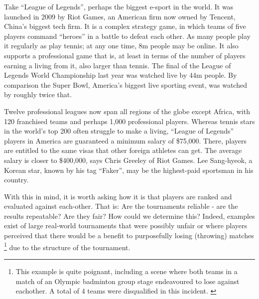 \documentclass[a4,11pt,twoside,final,hidelinks]{article}
\newenvironment{itquote} {\begin{quoting}\color{darkgray}} {\end{quoting}}
\begin{document}
\begin{itquote}
Take “League of Legends”, perhaps the biggest e-sport in the world. It was
launched in 2009 by Riot Games, an American firm now owned by Tencent, China’s
biggest tech firm. It is a complex strategy game, in which teams of five players
command “heroes” in a battle to defeat each other. As many people play it
regularly as play tennis; at any one time, 8m people may be online. It also
supports a professional game that is, at least in terms of the number of players
earning a living from it, also larger than tennis. The final of the League of
Legends World Championship last year was watched live by 44m people. By
comparison the Super Bowl, America’s biggest live sporting event, was watched by
roughly twice that.

Twelve professional leagues now span all regions of the globe except Africa,
with 120 franchised teams and perhaps 1,000 professional players. Whereas tennis
stars in the world’s top 200 often struggle to make a living, “League of
Legends” players in America are guaranteed a minimum salary of \$75,000. There,
players are entitled to the same visas that other foreign athletes can get. The
average salary is closer to \$400,000, says Chris Greeley of Riot Games. Lee
Sang-hyeok, a Korean star, known by his tag “Faker”, may be the highest-paid
sportsman in his country.
\end{itquote}

With this in mind, it is worth asking how it is that players are ranked and
evaluated against each-other. That is: Are the tournaments reliable - are the
results repeatable? Are they fair? How could we determine this? Indeed, examples
exist of large real-world tournaments that were possibly unfair
\autocite{fifa-quant-unfairness}\autocite{fifa-risk-of-collusion} or where players
perceived that there would be a benefit to purposefully losing (throwing)
matches \autocite{Walker2012}\footnote{This example is quite poignant, including a scene
where both teams in a match of an Olympic badminton group stage endeavoured to
lose against eachother. A total of 4 teams were disqualified in this incident.
\autocite{double-elim-structure-efficacy-manipulation}} due to the structure of the
tournament.
\end{document}
